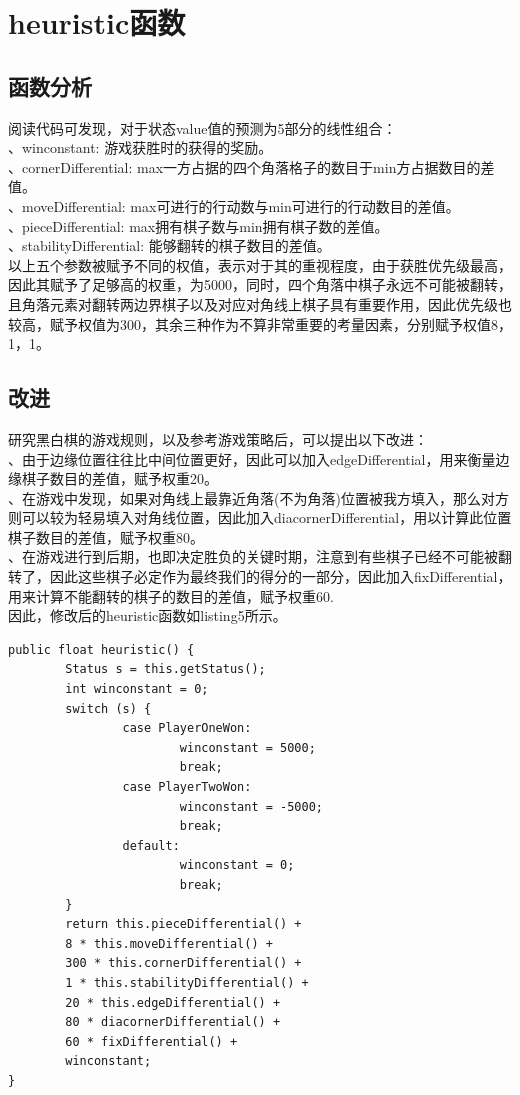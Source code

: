 \documentclass[UTF8]{article}
\begin{document}
\section{heuristic函数}
\subsection{函数分析}
\indent 阅读代码可发现，对于状态value值的预测为5部分的线性组合：\\
、winconstant: 游戏获胜时的获得的奖励。\\
、cornerDifferential: max一方占据的四个角落格子的数目于min方占据数目的差值。\\
、moveDifferential: max可进行的行动数与min可进行的行动数目的差值。\\
、pieceDifferential: max拥有棋子数与min拥有棋子数的差值。\\
、stabilityDifferential: 能够翻转的棋子数目的差值。\\
\indent 以上五个参数被赋予不同的权值，表示对于其的重视程度，由于获胜优先级最高，因此其赋予了足够高的权重，为5000，同时，四个角落中棋子永远不可能被翻转，且角落元素对翻转两边界棋子以及对应对角线上棋子具有重要作用，因此优先级也较高，赋予权值为300，其余三种作为不算非常重要的考量因素，分别赋予权值8，1，1。

\subsection{改进}
\indent 研究黑白棋的游戏规则，以及参考游戏策略后，可以提出以下改进：\\
、由于边缘位置往往比中间位置更好，因此可以加入edgeDifferential，用来衡量边缘棋子数目的差值，赋予权重20。\\
、在游戏中发现，如果对角线上最靠近角落(不为角落)位置被我方填入，那么对方则可以较为轻易填入对角线位置，因此加入diacornerDifferential，用以计算此位置棋子数目的差值，赋予权重80。\\
、在游戏进行到后期，也即决定胜负的关键时期，注意到有些棋子已经不可能被翻转了，因此这些棋子必定作为最终我们的得分的一部分，因此加入fixDifferential，用来计算不能翻转的棋子的数目的差值，赋予权重60.\\
\indent 因此，修改后的heuristic函数如listing5所示。

\begin{lstlisting}[caption=改进后的heuristic函数]
public float heuristic() {
		Status s = this.getStatus();
		int winconstant = 0;
		switch (s) {
				case PlayerOneWon:
						winconstant = 5000;
						break;
				case PlayerTwoWon:
						winconstant = -5000;
						break;
				default:
						winconstant = 0;
						break;
		}
		return this.pieceDifferential() +
		8 * this.moveDifferential() +
		300 * this.cornerDifferential() +
		1 * this.stabilityDifferential() + 
		20 * this.edgeDifferential() +
		80 * diacornerDifferential() +
		60 * fixDifferential() +
		winconstant;
}
\end{lstlisting}
\end{document}
